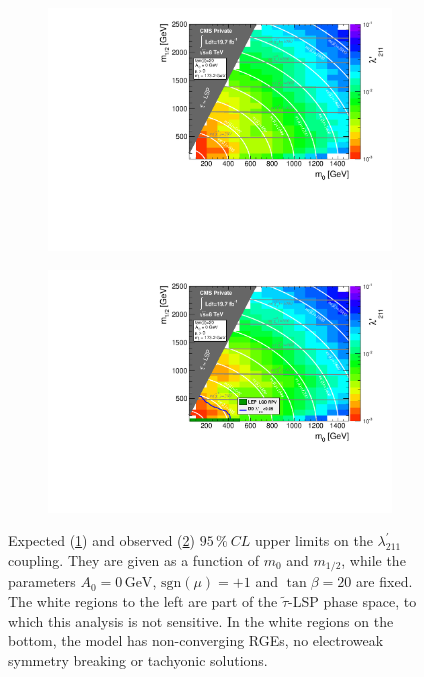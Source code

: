 \begin{figure}[!htbp]
  \centering
  \begin{subfigure}[b]{0.85\textwidth}
    \centering
    \includegraphics[width=\textwidth]{plots/l211limits_MultiBin_expected_logz-colz.pdf}
    \caption{\label{fig:lambda-prime-exp}}
  \end{subfigure}
  \begin{subfigure}[b]{0.85\textwidth}
    \centering
    \includegraphics[width=\textwidth]{plots/l211limits_MultiBin_logz-colz.pdf}
    \caption{\label{fig:lambda-prime-obs}}
  \end{subfigure}
  \caption{Expected (\ref{fig:lambda-prime-exp}) and observed (\ref{fig:lambda-prime-obs}) $95\,\%\: CL$ upper limits on the $\lambda^{\prime}_{211}$ coupling. They are given as a function of $m_0$ and $m_{1/2}$, while the parameters $A_0 = 0\,\text{GeV}$, $\text{sgn}(\mu) = +1$ and $\tan{\beta} = 20$ are fixed. The white regions to the left are part of the $\tilde{\tau}$-LSP phase space, to which this analysis is not sensitive. In the white regions on the bottom, the model has non-converging RGEs, no electroweak symmetry breaking or tachyonic solutions.}
  \label{fig:lambda-prime-limits}
\end{figure}

